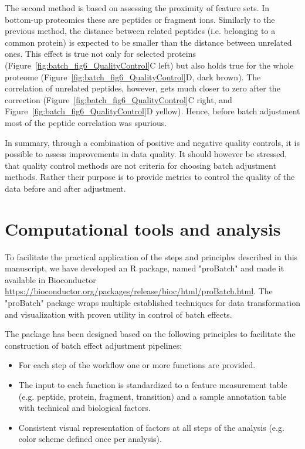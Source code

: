 \documentclass[num-refs]{wiley-article}
\begin{document}
The second method is based on assessing the proximity of feature sets. In bottom-up proteomics these are peptides or fragment ions. Similarly to the previous method, the distance between related peptides (i.e. belonging to a common protein) is expected to be smaller than the distance between unrelated ones. This effect is true not only for selected proteins (Figure~\ref{fig:batch_fig6_QualityControl}C left) but also holds true for the whole proteome (Figure~\ref{fig:batch_fig6_QualityControl}D, dark brown). The correlation of unrelated peptides, however, gets much closer to zero after the correction (Figure~\ref{fig:batch_fig6_QualityControl}C right, and Figure~\ref{fig:batch_fig6_QualityControl}D yellow). Hence, before batch adjustment most of the peptide correlation was spurious.

In summary, through a combination of positive and negative quality controls, it is possible to assess improvements in data quality. It should however be stressed, that quality control methods are not criteria for choosing batch adjustment methods. Rather their purpose is to provide metrics to control the quality of the data before and after adjustment.

\section{Computational tools and analysis}

To facilitate the practical application of the steps and principles described in this manuscript, we have developed an R package, named "proBatch" and made it available in Bioconductor \url{https://bioconductor.org/packages/release/bioc/html/proBatch.html}. The "proBatch" package wraps multiple established techniques for data transformation and visualization with proven utility in control of batch effects. 

The package has been designed based on the following principles to facilitate the construction of batch effect adjustment pipelines:
\begin{itemize}
    \item For each step of the workflow one or more functions are provided.
    \item The input to each function is standardized to a feature measurement table (e.g. peptide, protein, fragment, transition) and a sample annotation table with technical and biological factors.
    \item Consistent visual representation of factors at all steps of the analysis (e.g. color scheme defined once per analysis).
\end{itemize}
\end{document}
